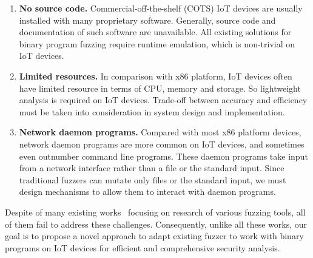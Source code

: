 \begin{enumerate}
\item \textbf{No source code.} Commercial-off-the-shelf (COTS) IoT devices are usually installed with many proprietary software. Generally, source code and documentation of such software are unavailable. All existing solutions for binary program fuzzing require runtime emulation, which is non-trivial on IoT devices. %

\item \textbf{Limited resources.} In comparison with x86 platform, IoT devices often have limited resource in terms of CPU, memory and storage. So lightweight analysis is required on IoT devices. Trade-off between accuracy and efficiency must be taken into consideration in system design and implementation.
\item \textbf{Network daemon programs.} Compared with most x86 platform devices, network daemon programs are more common on IoT devices, and sometimes even outnumber command line programs. These daemon programs take input from a network interface rather than a file or the standard input. Since traditional fuzzers can mutate only files or the standard input, we must design mechanisms to allow them to interact with daemon programs.  





\end{enumerate}

Despite of many existing works~\cite{rawat2017vuzzer, bohme2017coverage, cadar2008klee, stephens2016driller, godefroid2012sage, godefroid2005dart, sen2005cute, cha2015program, haller2013dowsing, ganesh2009taint, wang2010taintscope, bastani2017synthesizing, godefroid2017learn, wang2017skyfire} focusing on research of various fuzzing tools, all of them fail to address these challenges. Consequently, unlike all these works, our goal is to propose a novel approach to adapt existing fuzzer to work with binary programs on IoT devices for efficient and comprehensive security analysis. 


